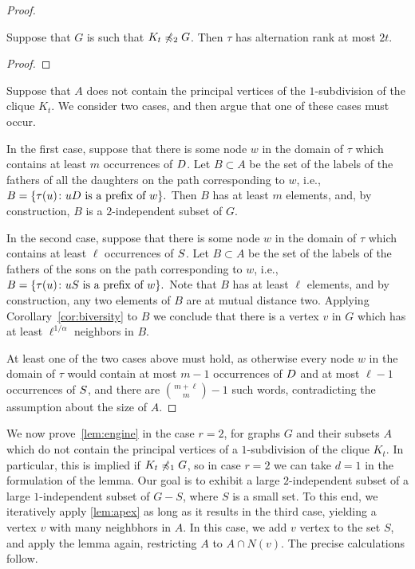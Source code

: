 \begin{proof}
\begin{lemma}\label{thm:alternation-rank-type-tree}
Suppose that  $G$ is such that $K_t\not\preccurlyeq_{2} G$.
Then $\tau$ has alternation rank at most $2t$.
\end{lemma}
\begin{proof}
	
\end{proof}

Suppose that $A$ does not contain the principal vertices of the $1$-subdivision of the clique $K_t$.
We consider two cases, and then argue that one of these cases must occur.

In the first case, suppose that there is some node $w$
  in the domain of $\tau$
  which contains at least $m$ occurrences of $D$.
	Let $B\subset A$ be the set of the labels of the 
	fathers of all the daughters on the path corresponding to $w$, i.e.,
  	$B=\{\tau(u)\colon 
  	uD \text{ is a prefix of }w\}.$
    Then $B$ has at least $m$ elements,
    and, by construction, $B$ is a $2$-independent subset of $G$.  

In the second case, suppose that there  is some node $w$ in the domain of $\tau$ which contains at least $\ell$ occurrences of $S$.
	Let $B\subset A$ be the set of the labels of the 
	fathers of the sons on the path corresponding to $w$, i.e.,
	$B=\{\tau(u)\colon 
	uS \text{ is a prefix of }w\}.$
	Note that $B$ has at least $\ell$ elements,
	and by construction, any two elements of $B$ are at mutual distance two. Applying Corollary~\ref{cor:biversity} to $B$ we conclude that there is a vertex $v$ in $G$ which has at least $\ell^{1/\alpha}$ neighbors in $B$.
  
   At least one of the two cases above must hold, as otherwise every node $w$ in the domain of $\tau$
  would contain at most  $m-1$ occurrences of $D$
  and at most $\ell-1$ occurrences of $S$, and there
are  ${{m+\ell}\choose m}-1$
  such words, contradicting the assumption about 
  the size of $A$.
\end{proof}



We now prove~\cref{lem:engine} in the case $r=2$,
for graphs $G$ and their subsets $A$ 
which do not contain the principal vertices of a $1$-subdivision of the clique $K_t$. In particular, this is implied 
if $K_t\not\preccurlyeq_1 G$, so in case $r=2$
we can take $d=1$ in the formulation of the lemma.
Our goal is to exhibit a large $2$-independent subset 
of a large $1$-independent subset of  $G-S$, where $S$ is a small set. 
To this end, we iteratively apply \cref{lem:apex} as long as  it results in the third case, yielding a vertex $v$ with many neighbhors in $A$. In this case, we add $v$ vertex to the set $S$, and apply the lemma again,
restricting $A$ to $A\cap N(v)$. 
The precise calculations follow.

